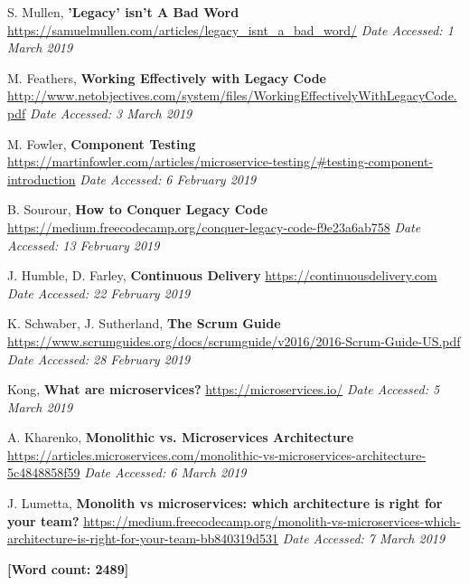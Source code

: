 \documentclass[11pt]{article}
\begin{document}
{\footnotesize
\begin{thebibliography}{9}
    S. Mullen, \textbf{'Legacy' isn't A Bad Word}
    \url{https://samuelmullen.com/articles/legacy_isnt_a_bad_word/}
    \textit{Date Accessed: 1 March 2019}
    
    M. Feathers, \textbf{Working Effectively with Legacy Code}
    \url{http://www.netobjectives.com/system/files/WorkingEffectivelyWithLegacyCode.pdf}
    \textit{Date Accessed: 3 March 2019}

    M. Fowler, \textbf{Component Testing}
    \url{https://martinfowler.com/articles/microservice-testing/#testing-component-introduction}
    \textit{Date Accessed: 6 February 2019}

    B. Sourour, \textbf{How to Conquer Legacy Code}
    \url{https://medium.freecodecamp.org/conquer-legacy-code-f9e23a6ab758}
    \textit{Date Accessed: 13 February 2019}

    J. Humble, D. Farley, \textbf{Continuous Delivery}
    \url{https://continuousdelivery.com}
    \textit{Date Accessed: 22 February 2019}

    K. Schwaber, J. Sutherland, \textbf{The Scrum Guide}
    \url{https://www.scrumguides.org/docs/scrumguide/v2016/2016-Scrum-Guide-US.pdf}
    \textit{Date Accessed: 28 February 2019}

    Kong, \textbf{What are microservices?}
    \url{https://microservices.io/}
    \textit{Date Accessed: 5 March 2019}

    A. Kharenko, \textbf{Monolithic vs. Microservices Architecture}
    \url{https://articles.microservices.com/monolithic-vs-microservices-architecture-5c4848858f59}
    \textit{Date Accessed: 6 March 2019}

    J. Lumetta, \textbf{Monolith vs microservices: which architecture is right for your team?}
    \url{https://medium.freecodecamp.org/monolith-vs-microservices-which-architecture-is-right-for-your-team-bb840319d531}
    \textit{Date Accessed: 7 March 2019}
\end{thebibliography}
}

{\bf [Word count: 2489]}
\end{document}
